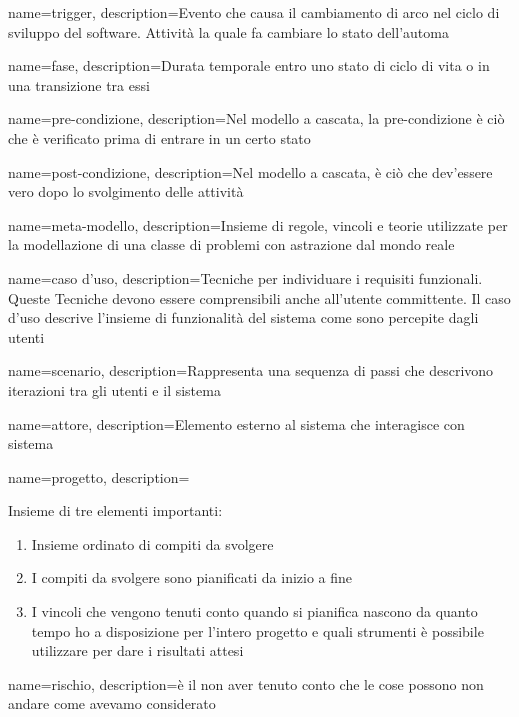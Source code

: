 {
name=trigger,
description={Evento che causa il cambiamento di arco nel ciclo di sviluppo del software. Attivit\`a la quale fa cambiare lo stato dell'automa}
}

{
name=fase,
description={Durata temporale entro uno stato di ciclo di vita o in una transizione tra essi}
}


{
name=pre-condizione,
description={Nel modello a cascata, la pre-condizione \`e ci\`o che \`e verificato prima di entrare in un certo stato}
}

{
name=post-condizione,
description={Nel modello a cascata, \`e ci\`o che dev'essere vero dopo lo svolgimento delle attivit\`a}
}

{
name=meta-modello,
description={Insieme di regole, vincoli e teorie utilizzate per la modellazione di una classe di problemi con astrazione dal mondo reale}
}

{
name=caso d'uso,
description={Tecniche per individuare i requisiti funzionali. Queste Tecniche devono essere comprensibili anche all'utente committente. Il caso d'uso descrive l'insieme di funzionalit\`a del sistema come sono percepite dagli utenti}
}

{
name=scenario,
description={Rappresenta una sequenza di passi che descrivono iterazioni tra gli utenti e il sistema}
}

{
name=attore,
description={Elemento esterno al sistema che interagisce con sistema}
}

{
name=progetto,
description={Insieme di tre elementi importanti: \begin{enumerate}
\item Insieme ordinato di compiti da svolgere
\item I compiti da svolgere sono pianificati da inizio a fine
\item I vincoli che vengono tenuti conto quando si pianifica nascono da quanto tempo ho a disposizione per l'intero progetto e quali strumenti \`e possibile utilizzare per dare i risultati attesi
\end{enumerate}
}
}

{
name=rischio,
description={\`e il non aver tenuto conto che le cose possono non andare come avevamo considerato}
}

